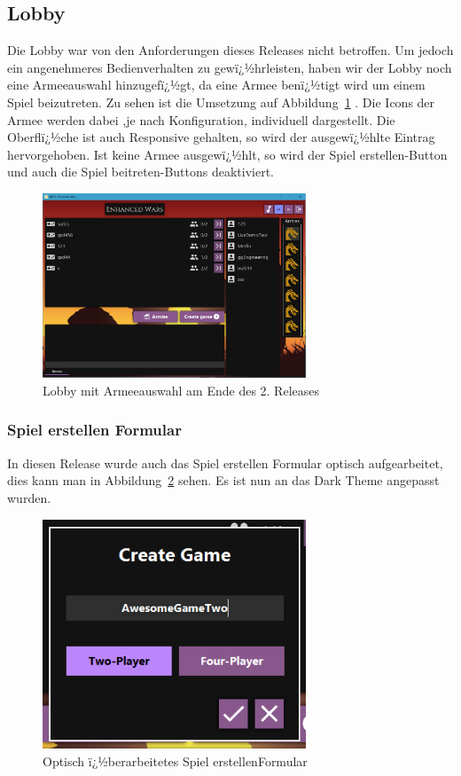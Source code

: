 \documentclass[12pt, titlepage]{scrartcl}
\newcommand{\Abb}[1]{%
	Abbildung\ \ref{#1}%
}
\begin{document}
			\subsection{Lobby}
			Die Lobby war von den Anforderungen dieses Releases nicht betroffen. Um jedoch ein angenehmeres Bedienverhalten zu gewï¿½hrleisten, haben wir der Lobby noch eine Armeeauswahl hinzugefï¿½gt, da eine Armee benï¿½tigt wird um einem Spiel beizutreten. Zu sehen ist die Umsetzung auf \Abb{LobbyFinal}. Die Icons der Armee werden dabei ,je nach Konfiguration, individuell dargestellt. Die Oberflï¿½che ist auch Responsive gehalten, so wird der ausgewï¿½hlte Eintrag hervorgehoben. Ist keine Armee ausgewï¿½hlt, so wird der Spiel erstellen-Button und auch die Spiel beitreten-Buttons deaktiviert.
			\begin{figure}[H] 
				\centering
				\includegraphics[width=0.7\textwidth]{Lobby_final.PNG}
				\caption{Lobby mit Armeeauswahl am Ende des 2. Releases}
				\label{LobbyFinal}
			\end{figure}
			
				\subsubsection{Spiel erstellen Formular}
				In diesen Release wurde auch das Spiel erstellen Formular optisch aufgearbeitet, dies kann man in \Abb{CreateGameFormularReworked} sehen. Es ist nun an das Dark Theme angepasst wurden.
				\begin{figure}[H] 
					\centering
					\includegraphics[width=0.7\textwidth]{Create_Game_final.PNG}
					\caption{Optisch ï¿½berarbeitetes \glqq Spiel erstellen\grqq Formular }
					\label{CreateGameFormularReworked}
				\end{figure}
			
\end{document}
